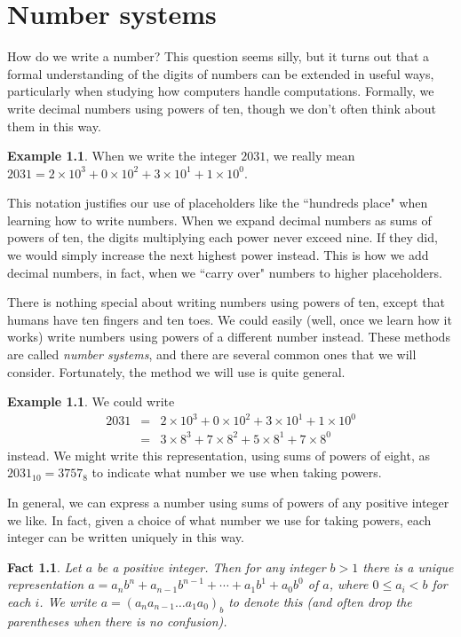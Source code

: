 \documentclass{book}
\theoremstyle{plain}
\newtheorem{fact}[theorem]{Fact}
\theoremstyle{definition}
\newtheorem{example}[theorem]{Example}
\begin{document}
\chapter{Number systems}
How do we write a number? This question seems silly, but it turns out that a formal understanding of the digits of numbers can be extended in useful ways, particularly when studying how computers handle computations. Formally, we write decimal numbers using powers of ten, though we don't often think about them in this way.

\begin{example}
When we write the integer $2031$, we really mean $2031 = 2 \times 10^3 + 0 \times 10^2 + 3 \times 10^1 + 1 \times 10^0$.
\end{example}

This notation justifies our use of placeholders like the ``hundreds place" when learning how to write numbers. When we expand decimal numbers as sums of powers of ten, the digits multiplying each power never exceed nine. If they did, we would simply increase the next highest power instead. This is how we add decimal numbers, in fact, when we ``carry over" numbers to higher placeholders.

There is nothing special about writing numbers using powers of ten, except that humans have ten fingers and ten toes. We could easily (well, once we learn how it works) write numbers using powers of a different number instead. These methods are called {\it number systems}, and there are several common ones that we will consider. Fortunately, the method we will use is quite general.

\begin{example}
We could write
\begin{eqnarray*}
2031 &=& 2 \times 10^3 + 0 \times 10^2 + 3 \times 10^1 + 1 \times 10^0 \\
&=& 3 \times 8^3 + 7 \times 8^2 + 5 \times 8^1 + 7 \times 8^0
\end{eqnarray*}
instead. We might write this representation, using sums of powers of eight, as $2031_{10} = 3757_8$ to indicate what number we use when taking powers.
\end{example}

In general, we can express a number using sums of powers of any positive integer we like. In fact, given a choice of what number we use for taking powers, each integer can be written uniquely in this way.

\begin{fact}
Let $a$ be a positive integer. Then for any integer $b > 1$ there is a unique representation $a = a_nb^n + a_{n-1}b^{n-1} + \cdots + a_1b^1 + a_0b^0$ of $a$, where $0 \leq a_i < b$ for each $i$. We write $a = (a_n a_{n-1} \ldots a_1 a_0)_b$ to denote this (and often drop the parentheses when there is no confusion).
\end{fact}
\end{document}
